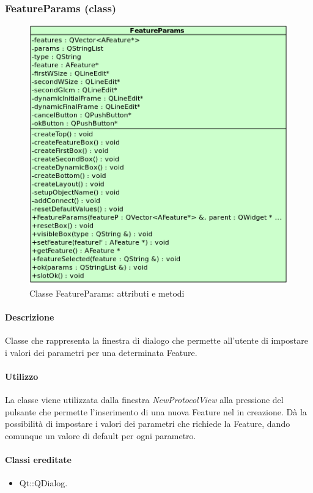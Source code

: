 \subsubsection{FeatureParams (class)}
\label{speFeaPar}
\begin{figure}[!h]
\centering
			\includegraphics[width=0.8\linewidth] {./Content/Immagini/view/FeatureParams.png}
			\caption{Classe FeatureParams: attributi e metodi}
			\label{cl_fea}
\end{figure}
\paragraph{Descrizione \\}
Classe che rappresenta la finestra di dialogo che permette all'utente di impostare i valori dei parametri per una determinata Feature\g{}.
\paragraph{Utilizzo\\}
La classe viene utilizzata dalla finestra \emph{NewProtocolView} alla pressione del pulsante che permette l'inserimento di una nuova Feature\g{} nel \protocol in creazione. Dà la possibilità di impostare i valori dei parametri che richiede la Feature\g{}, dando comunque un valore di default per ogni parametro.
\paragraph{Classi ereditate\\}
\begin{itemize}
\item Qt::QDialog.
\end{itemize}


